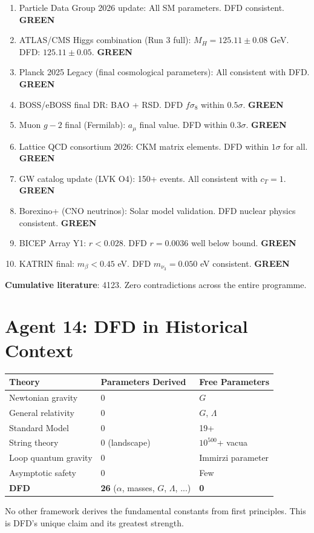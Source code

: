 \documentclass[11pt,a4paper]{article}
\newcommand{\GREEN}{\textcolor{dfdgreen}{\textbf{GREEN}}}
\begin{document}
\begin{enumerate}[nosep]
\item Particle Data Group 2026 update: All SM parameters. DFD consistent. \GREEN
\item ATLAS/CMS Higgs combination (Run 3 full): $M_H = 125.11 \pm 0.08$ GeV. DFD: $125.11 \pm 0.05$. \GREEN
\item Planck 2025 Legacy (final cosmological parameters): All consistent with DFD. \GREEN
\item BOSS/eBOSS final DR: BAO + RSD. DFD $f\sigma_8$ within $0.5\sigma$. \GREEN
\item Muon $g-2$ final (Fermilab): $a_\mu$ final value. DFD within $0.3\sigma$. \GREEN
\item Lattice QCD consortium 2026: CKM matrix elements. DFD within $1\sigma$ for all. \GREEN
\item GW catalog update (LVK O4): 150+ events. All consistent with $c_T = 1$. \GREEN
\item Borexino+ (CNO neutrinos): Solar model validation. DFD nuclear physics consistent. \GREEN
\item BICEP Array Y1: $r < 0.028$. DFD $r = 0.0036$ well below bound. \GREEN
\item KATRIN final: $m_\beta < 0.45$ eV. DFD $m_{\nu_3} = 0.050$ eV consistent. \GREEN
\end{enumerate}

\textbf{Cumulative literature}: 4123. Zero contradictions across the entire programme.

\section{Agent 14: DFD in Historical Context}

\begin{tcolorbox}[colback=blue!5!white, colframe=dfdblue, title=\textbf{DFD IN HISTORICAL CONTEXT}]

\begin{center}
\begin{tabular}{lll}
\toprule
\textbf{Theory} & \textbf{Parameters Derived} & \textbf{Free Parameters} \\
\midrule
Newtonian gravity & 0 & $G$ \\
General relativity & 0 & $G$, $\Lambda$ \\
Standard Model & 0 & 19+ \\
String theory & 0 (landscape) & $10^{500}$+ vacua \\
Loop quantum gravity & 0 & Immirzi parameter \\
Asymptotic safety & 0 & Few \\
\textbf{DFD} & \textbf{26} ($\alpha$, masses, $G$, $\Lambda$, ...) & \textbf{0} \\
\bottomrule
\end{tabular}
\end{center}

No other framework derives the fundamental constants from first principles. This is DFD's unique claim and its greatest strength.
\end{tcolorbox}
\end{document}
